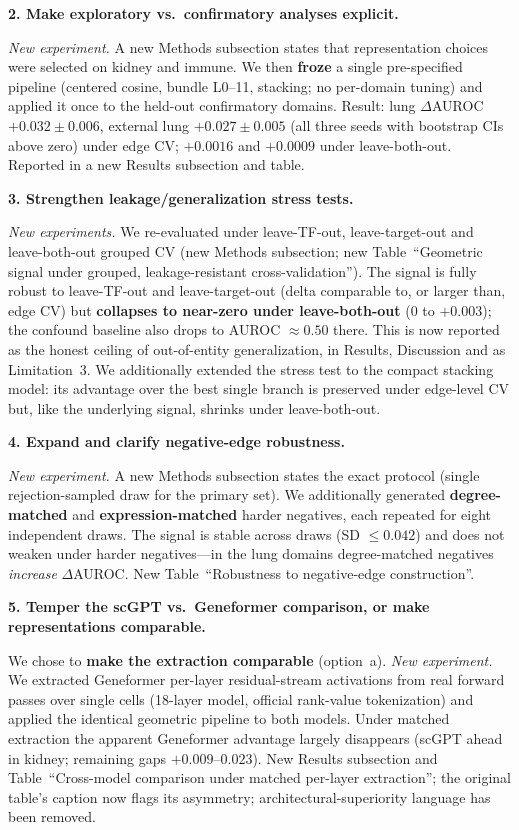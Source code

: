 \documentclass[11pt]{article}
\newcommand{\rc}[1]{\medskip\noindent\textbf{#1}\par}
\begin{document}
\rc{2. Make exploratory vs.\ confirmatory analyses explicit.}
\textit{New experiment.} A new Methods subsection states that
representation choices were selected on kidney and immune. We then \textbf{froze}
a single pre-specified pipeline (centered cosine, bundle L0--11, stacking; no
per-domain tuning) and applied it once to the held-out confirmatory domains.
Result: lung $\Delta$AUROC $+0.032\pm0.006$, external lung $+0.027\pm0.005$ (all
three seeds with bootstrap CIs above zero) under edge CV; $+0.0016$ and $+0.0009$
under leave-both-out. Reported in a new Results subsection and table.

\rc{3. Strengthen leakage/generalization stress tests.}
\textit{New experiments.} We re-evaluated under
leave-TF-out, leave-target-out and leave-both-out grouped CV (new Methods
subsection; new Table~``Geometric signal under grouped, leakage-resistant
cross-validation''). The signal is fully robust to leave-TF-out and
leave-target-out (delta comparable to, or larger than, edge CV) but
\textbf{collapses to near-zero under leave-both-out} ($0$ to $+0.003$); the
confound baseline also drops to AUROC $\approx0.50$ there. This is now reported as
the honest ceiling of out-of-entity generalization, in Results, Discussion and as
Limitation~3. We additionally extended the stress test to the compact stacking
model: its advantage over the best single branch is preserved under
edge-level CV but, like the underlying signal, shrinks under leave-both-out.

\rc{4. Expand and clarify negative-edge robustness.}
\textit{New experiment.} A new Methods subsection states the exact
protocol (single rejection-sampled draw for the primary set). We additionally
generated \textbf{degree-matched} and \textbf{expression-matched} harder
negatives, each repeated for eight independent draws. The signal is stable across
draws (SD $\le 0.042$) and does not weaken under harder negatives---in the lung
domains degree-matched negatives \emph{increase} $\Delta$AUROC. New
Table~``Robustness to negative-edge construction''.

\rc{5. Temper the scGPT vs.\ Geneformer comparison, or make representations
comparable.}
We chose to \textbf{make the extraction comparable} (option~a).
\textit{New experiment.} We extracted Geneformer per-layer
residual-stream activations from real forward passes over single cells (18-layer
model, official rank-value tokenization) and applied the identical geometric
pipeline to both models. Under matched extraction the apparent Geneformer
advantage largely disappears (scGPT ahead in kidney; remaining gaps
$+0.009$--$0.023$). New Results subsection and Table~``Cross-model comparison
under matched per-layer extraction''; the original table's caption now flags its
asymmetry; architectural-superiority language has been removed.
\end{document}
